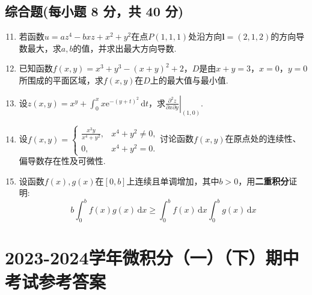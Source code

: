 \documentclass[../main.tex]{subfiles}
\begin{document}
\section{综合题(每小题 8 分，共 40 分)}
\begin{enumerate}
    \setcounter{enumi}{10}
    \item 若函数$u=az^{4}-bxz+x^{2}+y^{2}$在点$P(1,1,1)$处沿方向$\boldsymbol
              {l}=(2,1,2)$的方向导数最大，求$a,b$的值，并求出最大方向导数.
          \vspace{13em}

    \item 已知函数$f(x,y)=x^{3}+y^{3}-(x+y)^{2}+2$，$D$是由$x+y=3$，$x=0$，$y
              =0$所围成的平面区域，求$f(x,y)$在$D$上的最大值与最小值.
          \vspace{13em}

    \item 设$z(x,y)=x^{y}+\int_{0}^{x}x\mathrm{e}^{-(y+t)^2}\,\mathrm{d}t$，求$\left
              .\frac{\partial^{2} z}{\partial x \partial y}\right|_{(1,0)}$.
          \vspace{12em}

    \item 设$f(x,y)=
              \begin{cases}
                  \frac{x^3y}{x^4+y^2}, & x^{4}+y^{2}\neq0, \\
                  0,                    & x^{4}+y^{2}=0.
              \end{cases}$讨论函数$f(x,y)$在原点处的连续性、偏导数存在性及可微性.
          \vspace{12em}

    \item 设函数$f(x),g(x)$在$[0,b]$上连续且单调增加，其中$b>0$，用\textbf{二重积分}证明:
          \[
              b\int_{0}^{b}f(x)g(x)\,\mathrm{d}x\geq \int_{0}^{b}f(x)\,\mathrm{d}x\int_{0}^{b}
              g(x)\,\mathrm{d}x
          \]
          \vspace{10em}
\end{enumerate}

\chapter{2023-2024学年微积分（一）（下）期中考试参考答案}
\end{document}
